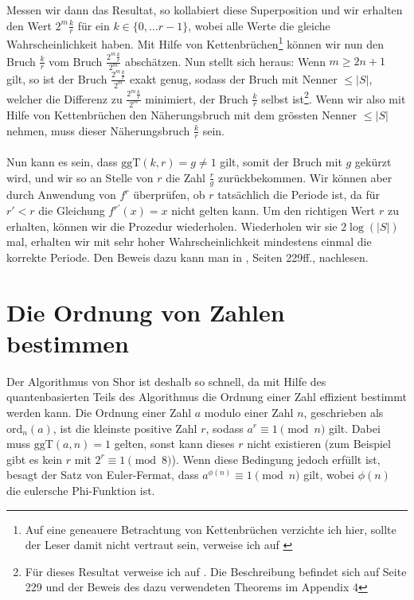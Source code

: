 Messen wir dann das Resultat, so kollabiert diese Superposition und wir erhalten den Wert $2^m\frac{k}{r}$ für ein $k \in \{0, \dots r - 1\}$, wobei alle Werte die gleiche Wahrscheinlichkeit haben. Mit Hilfe von Kettenbrüchen\footnote{Auf eine geneauere Betrachtung von Kettenbrüchen verzichte ich hier, sollte der Leser damit nicht vertraut sein, verweise ich auf \cite{Frac}} können wir nun den Bruch $\frac{k}{r}$ vom Bruch $\frac{2^m\frac{k}{r}}{2^m}$ abschätzen. Nun stellt sich heraus: Wenn $m \geq 2n + 1$ gilt, so ist der Bruch $\frac{2^m\frac{k}{r}}{2^m}$ exakt genug, sodass der Bruch mit Nenner $\leq |S|$, welcher die Differenz zu $\frac{2^m\frac{k}{r}}{2^m}$ minimiert, der Bruch $\frac{k}{r}$ selbst ist\footnote{Für dieses Resultat verweise ich auf \cite{QC}. Die Beschreibung befindet sich auf Seite 229 und der Beweis des dazu verwendeten Theorems im Appendix 4}. Wenn wir also mit Hilfe von Kettenbrüchen den Näherungsbruch mit dem grössten Nenner $\leq |S|$ nehmen, muss dieser Näherungsbruch $\frac{k}{r}$ sein.
\paragraph{}
Nun kann es sein, dass $\text{ggT}(k, r) = g \neq 1$ gilt, somit der Bruch mit $g$ gekürzt wird, und wir so an Stelle von $r$ die Zahl $\frac{r}{g}$ zurückbekommen. Wir können aber durch Anwendung von $f^r$ überprüfen, ob $r$ tatsächlich die Periode ist, da für $r' < r$ die Gleichung $f^{r'}(x) = x$ nicht gelten kann. Um den richtigen Wert $r$ zu erhalten, können wir die Prozedur wiederholen. Wiederholen wir sie $2\log(|S|)$ mal, erhalten wir mit sehr hoher Wahrscheinlichkeit mindestens einmal die korrekte Periode. Den Beweis dazu kann man in \cite{QC}, Seiten 229ff., nachlesen.

\section{Die Ordnung von Zahlen bestimmen}
Der Algorithmus von Shor ist deshalb so schnell, da mit Hilfe des quantenbasierten Teils des Algorithmus die Ordnung einer Zahl effizient bestimmt werden kann. Die Ordnung einer Zahl $a$ modulo einer Zahl $n$, geschrieben als $\text{ord}_n(a)$, ist die kleinste positive Zahl $r$, sodass $a^r \equiv 1 \pmod{n}$ gilt. Dabei muss $\text{ggT}(a, n) = 1$ gelten, sonst kann dieses $r$ nicht existieren (zum Beispiel gibt es kein $r$ mit $2^r \equiv 1 \pmod{8}$). Wenn diese Bedingung jedoch erfüllt ist, besagt der Satz von Euler-Fermat, dass $a^{\phi(n)} \equiv 1 \pmod{n}$ gilt, wobei $\phi(n)$ die eulersche Phi-Funktion ist. 

